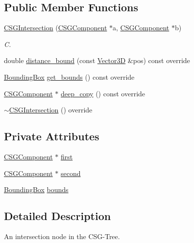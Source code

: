 \subsection*{Public Member Functions}
\begin{DoxyCompactItemize}
\item 
\hyperlink{classCSGIntersection_a0d74ea7a39a6fbfe3e6f3f918b01f63d}{C\+S\+G\+Intersection} (\hyperlink{classCSGComponent}{C\+S\+G\+Component} $\ast$a, \hyperlink{classCSGComponent}{C\+S\+G\+Component} $\ast$b)
\begin{DoxyCompactList}\small\item\em C. \end{DoxyCompactList}\item 
double \hyperlink{classCSGIntersection_a199cc8192cdaeacae17d5b3c6dfef6a1}{distance\+\_\+bound} (const \hyperlink{classVector3D}{Vector3D} \&pos) const override
\item 
\hyperlink{classBoundingBox}{Bounding\+Box} \hyperlink{classCSGIntersection_ad1f53a70c93dcdb6f8725a491fa24917}{get\+\_\+bounds} () const override
\item 
\hyperlink{classCSGComponent}{C\+S\+G\+Component} $\ast$ \hyperlink{classCSGIntersection_a4721227de85e675484ab206c299c5867}{deep\+\_\+copy} () const override
\item 
\hyperlink{classCSGIntersection_a0407d092eed23f2e6493e848482e130e}{$\sim$\+C\+S\+G\+Intersection} () override
\end{DoxyCompactItemize}
\subsection*{Private Attributes}
\begin{DoxyCompactItemize}
\item 
\hyperlink{classCSGComponent}{C\+S\+G\+Component} $\ast$ \hyperlink{classCSGIntersection_af9619c91599eb3f81342000284e0f1c6}{first}
\item 
\hyperlink{classCSGComponent}{C\+S\+G\+Component} $\ast$ \hyperlink{classCSGIntersection_a71b90fe1c487c4cc5fce0614f503e29c}{second}
\item 
\hyperlink{classBoundingBox}{Bounding\+Box} \hyperlink{classCSGIntersection_a25fb136c5dcda3e15357b6c1abb1c2e2}{bounds}
\end{DoxyCompactItemize}


\subsection{Detailed Description}
An intersection node in the C\+S\+G-\/\+Tree. 

